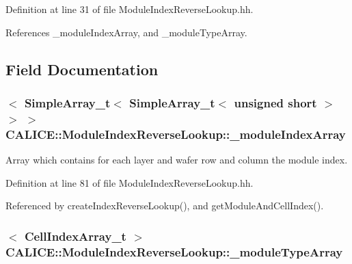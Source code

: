 Definition at line 31 of file Module\-Index\-Reverse\-Lookup.\-hh.



References \-\_\-module\-Index\-Array, and \-\_\-module\-Type\-Array.



\subsection{Field Documentation}
\subsubsection[{\-\_\-module\-Index\-Array}]{$<$ {\bf Simple\-Array\-\_\-t}$<$ {\bf Simple\-Array\-\_\-t}$<$ unsigned short $>$ $>$ $>$ C\-A\-L\-I\-C\-E\-::\-Module\-Index\-Reverse\-Lookup\-::\-\_\-module\-Index\-Array\hspace{0.3cm}{\ttfamily [protected]}}\label{classCALICE_1_1ModuleIndexReverseLookup_a6f4c66de3a572faa169b6d8f605e7e2f}


Array which contains for each layer and wafer row and column the module index. 



Definition at line 81 of file Module\-Index\-Reverse\-Lookup.\-hh.



Referenced by create\-Index\-Reverse\-Lookup(), and get\-Module\-And\-Cell\-Index().

\subsubsection[{\-\_\-module\-Type\-Array}]{$<$ {\bf Cell\-Index\-Array\-\_\-t} $>$ C\-A\-L\-I\-C\-E\-::\-Module\-Index\-Reverse\-Lookup\-::\-\_\-module\-Type\-Array\hspace{0.3cm}{\ttfamily [protected]}}\label{classCALICE_1_1ModuleIndexReverseLookup_a26cc1c3d8dba383ba59b4a8e8b96c98d}


